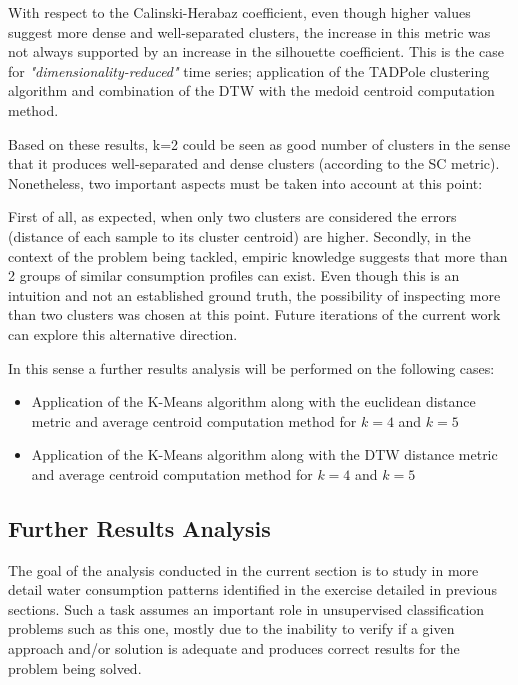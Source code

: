 \documentclass[9pt,journal,compsoc]{IEEEtran}
\begin{document}
With respect to the Calinski-Herabaz coefficient, even though higher values suggest more dense and well-separated clusters, the increase in this metric was not always supported by an increase in the silhouette coefficient. This is the case for \emph{"dimensionality-reduced"} time series; application of the TADPole clustering algorithm and combination of the DTW with the medoid centroid computation method.

Based on these results, k=2 could be seen as good number of clusters in the sense that it produces well-separated and dense clusters (according to the SC metric). Nonetheless, two important aspects must be taken into account at this point:

First of all, as expected, when only two clusters are considered the errors (distance of each sample to its cluster centroid) are higher. Secondly, in the context of the problem being tackled, empiric knowledge suggests that more than 2 groups of similar consumption profiles can exist. Even though this is an intuition and not an established ground truth, the possibility of inspecting more than two clusters was chosen at this point. Future iterations of the current work can explore this alternative direction.

In this sense a further results analysis will be performed on the following cases:

\begin{itemize}
	\item Application of the K-Means algorithm along with the euclidean distance metric and average centroid computation method for $k = 4$ and $k = 5$
	
	\item Application of the K-Means algorithm along with the DTW distance metric and average centroid computation method for $k = 4$ and $k = 5$
\end{itemize}

\subsection{Further Results Analysis}

The goal of the analysis conducted in the current section is to study in more detail water consumption patterns identified in the exercise detailed in previous sections. Such a task assumes an important role in unsupervised classification problems such as this one, mostly due to the inability to verify if a given approach and/or solution is adequate and produces correct results for the problem being solved.
\end{document}
